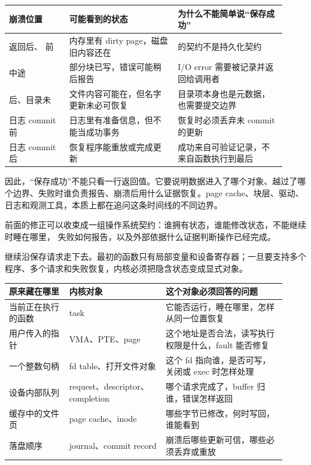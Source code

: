 \begin{longtable}{|L{0.2\linewidth}|L{0.36\linewidth}|L{0.36\linewidth}|}
\toprule
崩溃位置 & 可能看到的状态 & 为什么不能简单说“保存成功” \\
\midrule
{} 返回后、 前 & 内存里有 dirty page，磁盘旧内容还在 &  的契约不是持久化契约 \\\tablerowrule
{} 中途 & 部分块已写，错误可能稍后报告 & I/O error 需要被记录并返回给调用者 \\\tablerowrule
{} 后、目录未  & 文件内容可能在，但名字更新未必可恢复 & 目录项本身也是元数据，也需要提交边界 \\\tablerowrule
日志 commit 前 & 日志里有准备信息，但不能当成功事务 & 恢复时必须丢弃未 commit 的更新 \\\tablerowrule
日志 commit 后 & 恢复程序能重放或完成更新 & 成功来自可验证记录，不来自函数执行到最后 \\
\bottomrule
\end{longtable}

因此，“保存成功”不能只看一行返回值。它要说明数据进入了哪个对象、越过了哪个边界、失败时谁负责报告、崩溃后用什么证据恢复。page cache、块层、驱动、日志和观测工具，本质上都在追问这条时间线的不同边界。

前面的修正可以收束成一组操作系统契约：谁拥有状态，谁能修改状态，不能继续时睡在哪里，
失败如何报告，以及外部依据什么证据判断操作已经完成。

继续沿保存请求走下去。最初的函数只有局部变量和设备寄存器；一旦要支持多个程序、多个请求和失败恢复，内核必须把隐含状态变成显式对象。

\begin{longtable}{|L{0.2\linewidth}|L{0.32\linewidth}|L{0.4\linewidth}|}
\toprule
原来藏在哪里 & 内核对象 & 这个对象必须回答的问题 \\
\midrule
当前正在执行的函数 & task & 它能否运行，睡在哪里，怎样从同一位置恢复 \\\tablerowrule
用户传入的指针 & VMA、PTE、page & 这个地址是否合法，读写执行权限是什么，fault 能否修复 \\\tablerowrule
一个整数句柄 & fd table、打开文件对象 & 这个 fd 指向谁，是否可写，关闭或 exec 时怎样处理 \\\tablerowrule
设备内部队列 & request、descriptor、completion & 哪个请求完成了，buffer 归谁，错误怎样返回 \\\tablerowrule
缓存中的文件页 & page cache、inode & 哪些字节已修改，何时写回，谁能看到 \\\tablerowrule
落盘顺序 & journal、commit record & 崩溃后哪些更新可信，哪些必须丢弃或重放 \\
\bottomrule
\end{longtable}


